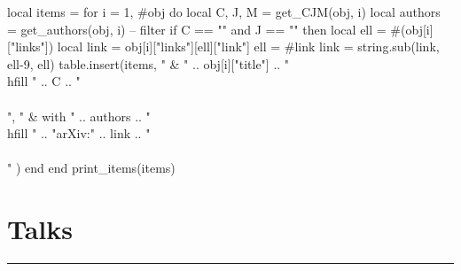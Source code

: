 \documentclass{article}
\begin{document}
\begin{luacode}
  local items = {}
  for i = 1, #obj do
    local C, J, M = get_CJM(obj, i)
    local authors = get_authors(obj, i)
    -- filter
    if C == "" and J == "" then
      local ell = #(obj[i]["links"])
      local link = obj[i]["links"][ell]["link"]
      ell = #link
      link = string.sub(link, ell-9, ell)
      table.insert(items, {
        " & " .. obj[i]["title"] .. " \\hfill " .. C .. "\\\\",
        " & with " .. authors .. " \\hfill " .. "arXiv:" .. link .. "\\\\"
      })
    end
  end
  print_items(items)
\end{luacode}

\section*{Talks}
\vspace{-1em} \hrule \vspace{1em}
\end{document}
